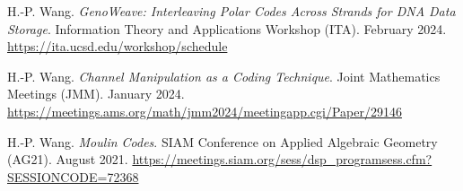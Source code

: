 \documentclass{article}
\def\sec#1{\vskip1em\textbf{\fs1#1}}
\def\fs#1{%
        \pgfmathsetmacro\a{#1}%
        \pgfmathsetmacro\A{\parskip*(4/3)^\a}%
        \pgfmathsetmacro\B{\A*(4/3)}%
        \fontsize{\A pt}{\B pt}\selectfont%
    }
\begin{document}
\bgroup
\def\section#1#2{\sec{Invited Talks \mdseries (new to old)}}
\begin{thebibliography}{T9}
    H.-P. Wang.
    \emph{GenoWeave: Interleaving Polar Codes Across Strands for DNA Data Storage}.
    Information Theory and Applications Workshop (ITA).
    February 2024.
    \url{https://ita.ucsd.edu/workshop/schedule}

    H.-P. Wang.
    \emph{Channel Manipulation as a Coding Technique}.
    Joint Mathematics Meetings (JMM).
    January 2024.
    \url{https://meetings.ams.org/math/jmm2024/meetingapp.cgi/Paper/29146}

    H.-P. Wang.
    \emph{Moulin Codes}.
    SIAM Conference on Applied Algebraic Geometry (AG21).
    August 2021.
    \url{https://meetings.siam.org/sess/dsp_programsess.cfm?SESSIONCODE=72368}
\end{thebibliography}
\egroup
\end{document}
